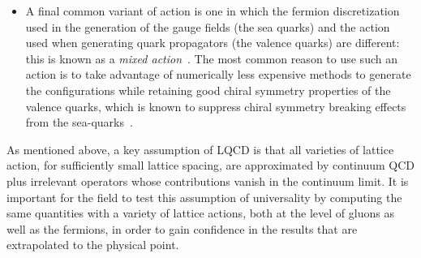 \begin{itemize}[leftmargin=*]
\item A final common variant of action is one in which the fermion discretization used in the generation of the gauge fields (the sea quarks) and the action used when generating quark propagators (the valence quarks) are different: this is known as a \textit{mixed action}~\cite{Renner:2004ck}.
The most common reason to use such an action is to take advantage of numerically less expensive methods to generate the configurations while retaining good chiral symmetry properties of the valence quarks, which is known to suppress chiral symmetry breaking effects from the sea-quarks~\cite{Bar:2002nr,Bar:2005tu,Tiburzi:2005is,Chen:2007ug}.

\end{itemize}
As mentioned above, a key assumption of LQCD is that all varieties of lattice action, for sufficiently small lattice spacing, are approximated by continuum QCD plus irrelevant operators whose contributions vanish in the continuum limit.
It is important for the field to test this assumption of universality by computing the same quantities with a variety of lattice actions, both at the level of gluons as well as the fermions, in order to gain confidence in the results that are extrapolated to the physical point.
